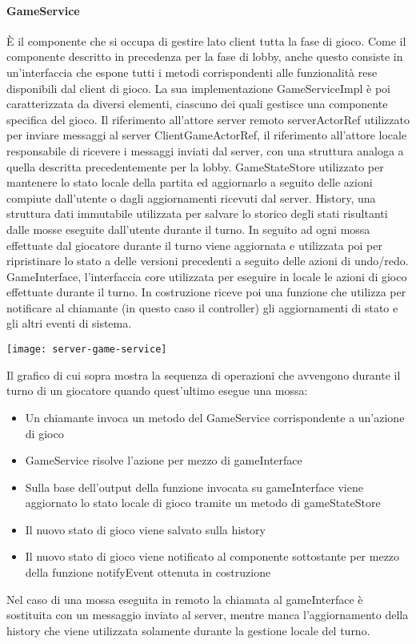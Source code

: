 \paragraph{GameService}
È il componente che si occupa di gestire lato client tutta la fase di gioco.
Come il componente descritto in precedenza per la fase di lobby, anche questo consiste in un’interfaccia che espone tutti i metodi corrispondenti alle funzionalità rese disponibili dal client di gioco.
La sua implementazione GameServiceImpl è poi caratterizzata da diversi elementi, ciascuno dei quali gestisce una componente specifica del gioco.
Il riferimento all’attore server remoto serverActorRef utilizzato per inviare messaggi al server
ClientGameActorRef, il riferimento all’attore locale responsabile di ricevere i messaggi inviati dal server, con una struttura analoga a quella descritta precedentemente per la lobby.
GameStateStore utilizzato per mantenere lo stato locale della partita ed aggiornarlo a seguito delle azioni compiute dall’utente o dagli aggiornamenti ricevuti dal server.
History, una struttura dati immutabile utilizzata per salvare lo storico degli stati risultanti dalle mosse eseguite dall’utente durante il turno.
In seguito ad ogni mossa effettuate dal giocatore durante il turno viene aggiornata e utilizzata poi per ripristinare lo stato a delle versioni precedenti a seguito delle azioni di undo/redo.
GameInterface, l’interfaccia core utilizzata per eseguire in locale le azioni di gioco effettuate durante il turno.
In costruzione riceve poi una funzione che utilizza per notificare al chiamante (in questo caso il controller) gli aggiornamenti di stato e gli altri eventi di sistema.
\begin{center}
    \texttt{[image: server-game-service]}
\end{center}
Il grafico di cui sopra mostra la sequenza di operazioni che avvengono durante il turno di un giocatore quando quest’ultimo esegue una mossa:
\begin{itemize}
    \item Un chiamante invoca un metodo del GameService corrispondente a un’azione di gioco
    \item GameService risolve l’azione per mezzo di gameInterface
    \item Sulla base dell’output della funzione invocata su gameInterface viene aggiornato lo stato locale di gioco tramite un metodo di gameStateStore
    \item Il nuovo stato di gioco viene salvato sulla history
    \item Il nuovo stato di gioco viene notificato al componente sottostante per mezzo della funzione notifyEvent ottenuta in costruzione
\end{itemize}
Nel caso di una mossa eseguita in remoto la chiamata al gameInterface è sostituita con un messaggio inviato al server, mentre manca l’aggiornamento della history che viene utilizzata solamente durante la gestione locale del turno.


